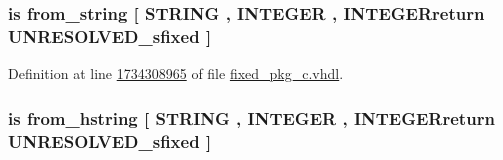 \hypertarget{classfixed__pkg_a9152bf71997f3ccb3ea38a0acc3227ad}{}
\subsubsection[{from\+\_\+bstring}]{ {\bfseries \textcolor{keywordflow}{is}\textcolor{vhdlchar}{ }\textcolor{vhdlchar}{from\+\_\+string}\textcolor{vhdlchar}{ }\textcolor{vhdlchar}{\mbox{[}}\textcolor{vhdlchar}{ }\textcolor{comment}{S\+T\+R\+I\+N\+G}\textcolor{vhdlchar}{ }\textcolor{vhdlchar}{,}\textcolor{vhdlchar}{ }\textcolor{comment}{I\+N\+T\+E\+G\+E\+R}\textcolor{vhdlchar}{ }\textcolor{vhdlchar}{,}\textcolor{vhdlchar}{ }\textcolor{vhdlchar}{I\+N\+T\+E\+G\+E\+Rreturn}\textcolor{vhdlchar}{ }{\bfseries {\bf U\+N\+R\+E\+S\+O\+L\+V\+E\+D\+\_\+sfixed}} \textcolor{vhdlchar}{ }\textcolor{vhdlchar}{\mbox{]}}\textcolor{vhdlchar}{ }} \hspace{0.3cm}{\ttfamily [Alias]}}\label{classfixed__pkg_a9152bf71997f3ccb3ea38a0acc3227ad}


Definition at line \hyperlink{fixed__pkg__c_8vhdl_source_l1734308965}{1734308965} of file \hyperlink{fixed__pkg__c_8vhdl_source}{fixed\+\_\+pkg\+\_\+c.\+vhdl}.

\hypertarget{classfixed__pkg_a741c442bc1dbeb9419d264c76b8dbac2}{}
\subsubsection[{from\+\_\+hex\+\_\+string}]{ {\bfseries \textcolor{keywordflow}{is}\textcolor{vhdlchar}{ }\textcolor{vhdlchar}{from\+\_\+hstring}\textcolor{vhdlchar}{ }\textcolor{vhdlchar}{\mbox{[}}\textcolor{vhdlchar}{ }\textcolor{comment}{S\+T\+R\+I\+N\+G}\textcolor{vhdlchar}{ }\textcolor{vhdlchar}{,}\textcolor{vhdlchar}{ }\textcolor{comment}{I\+N\+T\+E\+G\+E\+R}\textcolor{vhdlchar}{ }\textcolor{vhdlchar}{,}\textcolor{vhdlchar}{ }\textcolor{vhdlchar}{I\+N\+T\+E\+G\+E\+Rreturn}\textcolor{vhdlchar}{ }{\bfseries {\bf U\+N\+R\+E\+S\+O\+L\+V\+E\+D\+\_\+sfixed}} \textcolor{vhdlchar}{ }\textcolor{vhdlchar}{\mbox{]}}\textcolor{vhdlchar}{ }} \hspace{0.3cm}{\ttfamily [Alias]}}\label{classfixed__pkg_a741c442bc1dbeb9419d264c76b8dbac2}


